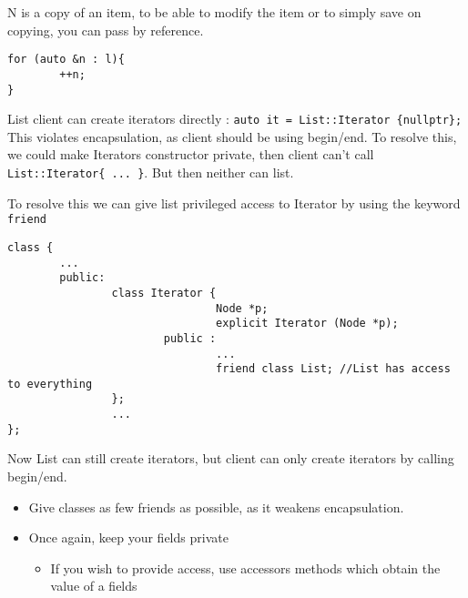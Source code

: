 \documentclass{article}
\newenvironment{cblock}[1]{%
    \tcolorbox[beamer,%
    noparskip,breakable,
    colback=lightblue,colframe=darkblue,%
    colbacklower=darkblue!75!lightblue,%
    title=#1]}%
    {\endtcolorbox}
\begin{document}
N is a copy of an item, to be able to modify the item or to simply save on copying, you can pass by reference.
\begin{lstlisting}
for (auto &n : l){
		++n;
}
\end{lstlisting}

List client can create iterators directly : \verb|auto it = List::Iterator {nullptr};| \\
This violates encapsulation, as client should be using begin/end. To resolve this, we could make Iterators constructor private, then client can't call \verb|List::Iterator{ ... }|. But then neither can list. 

To resolve this we can give list privileged access to Iterator by using the keyword \verb|friend|
\begin{lstlisting}
class {
		...
		public: 
				class Iterator {
								Node *p;
								explicit Iterator (Node *p);
						public :
								...
								friend class List; //List has access to everything
				};
				...
};						
\end{lstlisting}

Now List can still create iterators, but client can only create iterators by calling begin/end. 

\begin{cblock} {Some Useful Advice}
\begin{itemize}
\item Give classes as few friends as possible, as it weakens encapsulation. 
\item Once again, keep your fields private 
\begin{itemize}
\item If you wish to provide access, use accessors methods which obtain the value of a fields
\end{itemize}
\end{itemize}
\end{cblock}
\end{document}
